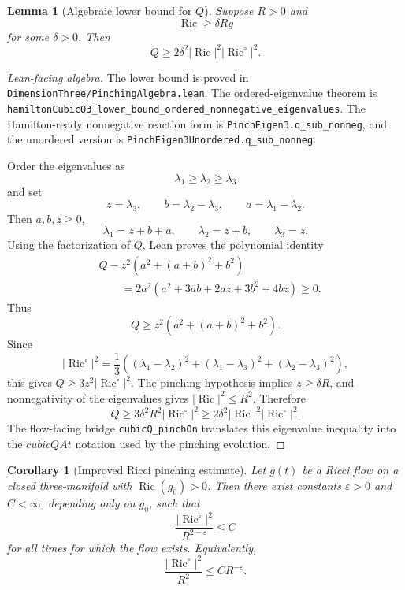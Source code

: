 \documentclass[11pt]{article}
\theoremstyle{plain}
\newtheorem{lemma}[theorem]{Lemma}
\newtheorem{corollary}[theorem]{Corollary}
\theoremstyle{definition}
\theoremstyle{remark}
\newcommand{\Ric}{\operatorname{Ric}}
\newcommand{\norm}[1]{\left|#1\right|}
\newcommand{\eps}{\varepsilon}
\newcommand{\del}{\delta}
\newcommand{\leanref}[1]{\nolinkurl{#1}}
\newcommand{\leanfile}[1]{\nolinkurl{#1}}
\newcommand{\rffile}[1]{\leanfile{#1}}
\begin{document}
\begin{lemma}[Algebraic lower bound for $Q$]
\label{lem:Q-lower-bound}
Suppose $R>0$ and
\[
\Ric\ge\del Rg
\]
for some $\del>0$. Then
\[
Q\ge 2\del^2\norm{\Ric}^2\norm{\Ric^\circ}^2.
\]
\end{lemma}

\begin{proof}[Lean-facing algebra]
The lower bound is proved in
\rffile{DimensionThree/PinchingAlgebra.lean}.  The ordered-eigenvalue theorem
is \leanref{hamiltonCubicQ3_lower_bound_ordered_nonnegative_eigenvalues}.  The
Hamilton-ready nonnegative reaction form is \leanref{PinchEigen3.q_sub_nonneg},
and the unordered version is \leanref{PinchEigen3Unordered.q_sub_nonneg}.

Order the eigenvalues as
\[
  \lambda_1\ge\lambda_2\ge\lambda_3
\]
and set
\[
  z=\lambda_3,
  \qquad
  b=\lambda_2-\lambda_3,
  \qquad
  a=\lambda_1-\lambda_2.
\]
Then \(a,b,z\ge0\),
\[
  \lambda_1=z+b+a,
  \qquad
  \lambda_2=z+b,
  \qquad
  \lambda_3=z.
\]
Using the factorization of \(Q\), Lean proves the polynomial identity
\begin{align*}
&Q-z^2\left(a^2+(a+b)^2+b^2\right) \\
&\qquad
=
2a^2\left(a^2+3ab+2az+3b^2+4bz\right)
\ge0.
\end{align*}
Thus
\[
  Q\ge z^2\left(a^2+(a+b)^2+b^2\right).
\]
Since
\[
\norm{\Ric^\circ}^2
=
\frac13\left(
(\lambda_1-\lambda_2)^2
+(\lambda_1-\lambda_3)^2
+(\lambda_2-\lambda_3)^2
\right),
\]
this gives \(Q\ge3z^2\norm{\Ric^\circ}^2\).  The pinching hypothesis implies
\(z\ge\del R\), and nonnegativity of the eigenvalues gives
\(\norm{\Ric}^2\le R^2\).  Therefore
\[
Q
\ge
3\del^2 R^2\norm{\Ric^\circ}^2
\ge
2\del^2\norm{\Ric}^2\norm{\Ric^\circ}^2.
\]
The flow-facing bridge \leanref{cubicQ_pinchOn} translates this eigenvalue
inequality into the \(cubicQAt\) notation used by the pinching evolution.
\end{proof}

\begin{corollary}[Improved Ricci pinching estimate]
\label{cor:improved-ricci-pinching}
Let $g(t)$ be a Ricci flow on a closed three-manifold with $\Ric(g_0)>0$.
Then there exist constants $\eps>0$ and $C<\infty$, depending only on $g_0$,
such that
\[
\frac{\norm{\Ric^\circ}^2}{R^{2-\eps}}\le C
\]
for all times for which the flow exists.
Equivalently,
\[
\frac{\norm{\Ric^\circ}^2}{R^2}\le CR^{-\eps}.
\]
\end{corollary}
\end{document}
